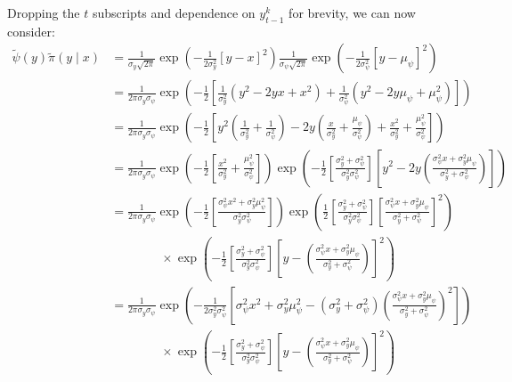\documentclass[a4paper]{article}
\begin{document}
Dropping the $t$ subscripts and dependence on $y^k_{t - 1}$ for brevity, we can now consider:
\begin{align}
    \tilde{\psi}\left(y\right)\tilde{\pi}\left(y \mid x\right) &= \frac{1}{\sigma_y\sqrt{2\pi}} \exp\left(-\frac{1}{2\sigma^2_y}\left[y - x\right]^2\right)\frac{1}{\sigma_{\psi}\sqrt{2\pi}} \exp\left(-\frac{1}{2\sigma^2_{\psi}}\left[y - \mu_{\psi}\right]^2\right)\nonumber\\
     &= \frac{1}{2\pi\sigma_y\sigma_{\psi}} \exp\left(-\frac{1}{2}\left[\frac{1}{\sigma^2_y}\left(y^2 - 2yx + x^2\right) + \frac{1}{\sigma^2_{\psi}}\left(y^2 - 2 y \mu_{\psi} + \mu^2_{\psi}\right)\right]\right)\nonumber\\
     &= \frac{1}{2\pi\sigma_y\sigma_{\psi}} \exp\left(-\frac{1}{2}\left[y^2\left(\frac{1}{\sigma^2_y} + \frac{1}{\sigma^2_{\psi}}\right) - 2y\left(\frac{x}{\sigma^2_y} + \frac{\mu_{\psi}}{\sigma^2_{\psi}}\right) + \frac{x^2}{\sigma^2_y} + \frac{\mu^2_{\psi}}{\sigma^2_{\psi}}\right]\right)\nonumber\\
     &= \frac{1}{2\pi\sigma_y\sigma_{\psi}} \exp\left(-\frac{1}{2}\left[\frac{x^2}{\sigma^2_y} + \frac{\mu^2_{\psi}}{\sigma^2_{\psi}}\right]\right)\exp\left(-\frac{1}{2}\left[\frac{\sigma^2_y + \sigma^2_{\psi}}{\sigma^2_y\sigma^2_{\psi}}\right]\left[y^2 - 2y\left(\frac{\sigma^2_{\psi}x + \sigma^2_y\mu_{\psi}}{\sigma^2_y + \sigma^2_{\psi}}\right)\right]\right)\nonumber\\
     &= \frac{1}{2\pi\sigma_y\sigma_{\psi}} \exp\left(-\frac{1}{2}\left[\frac{\sigma^2_{\psi}x^2 + \sigma^2_y\mu^2_{\psi}}{\sigma^2_y\sigma^2_{\psi}}\right]\right)\exp\left(\frac{1}{2}\left[\frac{\sigma^2_y + \sigma^2_{\psi}}{\sigma^2_y\sigma^2_{\psi}}\right]\left[\frac{\sigma^2_{\psi}x + \sigma^2_y\mu_{\psi}}{\sigma^2_y + \sigma^2_{\psi}}\right]^2\right)\nonumber\\
     & \qquad \qquad \times \exp\left(-\frac{1}{2}\left[\frac{\sigma^2_y + \sigma^2_{\psi}}{\sigma^2_y\sigma^2_{\psi}}\right]\left[y - \left(\frac{\sigma^2_{\psi}x + \sigma^2_y\mu_{\psi}}{\sigma^2_y + \sigma^2_{\psi}}\right)\right]^2\right)\nonumber\\
     &= \frac{1}{2\pi\sigma_y\sigma_{\psi}} \exp\left(-\frac{1}{2\sigma^2_y \sigma^2_{\psi}}\left[\sigma^2_{\psi}x^2 + \sigma^2_y\mu^2_{\psi} - \left(\sigma^2_y + \sigma^2_{\psi}\right)\left(\frac{\sigma^2_{\psi}x + \sigma^2_y\mu_{\psi}}{\sigma^2_y + \sigma^2_{\psi}}\right)^2\right]\right)\nonumber\\
     & \qquad \qquad \times \exp\left(-\frac{1}{2}\left[\frac{\sigma^2_y + \sigma^2_{\psi}}{\sigma^2_y\sigma^2_{\psi}}\right]\left[y - \left(\frac{\sigma^2_{\psi}x + \sigma^2_y\mu_{\psi}}{\sigma^2_y + \sigma^2_{\psi}}\right)\right]^2\right)\nonumber\\

\end{align}
\end{document}
